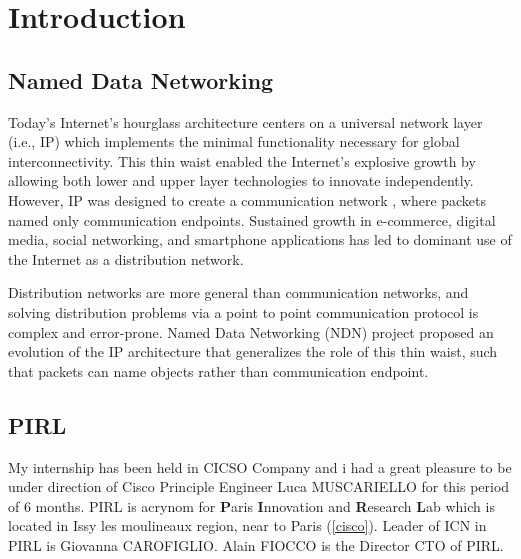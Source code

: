 
\chapter{Introduction} %

\label{Chapter1} %


\section{Named Data Networking}

Today's Internet's hourglass architecture centers on a
universal network layer (i.e., IP) which implements the minimal functionality  necessary  for  global interconnectivity. This thin  waist  enabled  the Internet's  explosive  growth  by  allowing both lower and upper layer technologies to innovate independently.  However, IP was designed to create a communication  network
, where  packets  named  only  communication endpoints.  Sustained growth in e-commerce, digital media, social networking, and smartphone applications has led to dominant use of the Internet as a distribution network.

Distribution networks are more general than communication
networks, and solving distribution problems via a point to point communication protocol is complex and error-prone.
Named Data Networking (NDN) project proposed an
evolution of the IP architecture that generalizes the role of this  thin  waist,  such  that  packets  can  name  objects  rather than  communication  endpoint.

\section{PIRL}

My internship has been held in CICSO Company and i had a great pleasure to be under direction of Cisco Principle Engineer Luca MUSCARIELLO  for this period of 6 months. PIRL is acrynom for \textbf{P}aris \textbf{I}nnovation and \textbf{R}esearch \textbf{L}ab which is located in Issy les moulineaux region, near to Paris (\ref{cisco}). Leader of ICN in PIRL is Giovanna CAROFIGLIO. Alain FIOCCO is the  Director CTO of PIRL.


